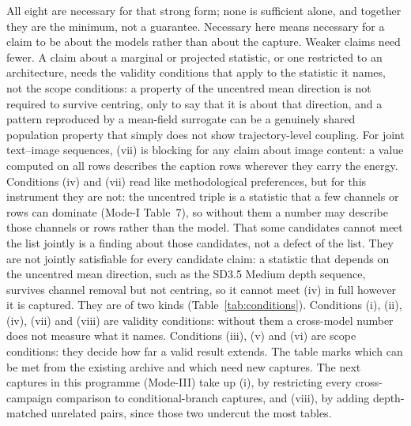 \documentclass[11pt]{article}
\theoremstyle{definition}
\begin{document}
All eight are necessary for that strong form; none is sufficient alone, and together they are the minimum, not a guarantee. Necessary here means necessary for a claim to be about the models rather than about the capture. Weaker claims need fewer. A claim about a marginal or projected statistic, or one restricted to an architecture, needs the validity conditions that apply to the statistic it names, not the scope conditions: a property of the uncentred mean direction is not required to survive centring, only to say that it is about that direction, and a pattern reproduced by a mean-field surrogate can be a genuinely shared population property that simply does not show trajectory-level coupling. For joint text--image sequences, (vii) is blocking for any claim about image content: a value computed on all rows describes the caption rows wherever they carry the energy. Conditions (iv) and (vii) read like methodological preferences, but for this instrument they are not: the uncentred triple is a statistic that a few channels or rows can dominate (Mode-I Table~7), so without them a number may describe those channels or rows rather than the model. That some candidates cannot meet the list jointly is a finding about those candidates, not a defect of the list. They are not jointly satisfiable for every candidate claim: a statistic that depends on the uncentred mean direction, such as the SD3.5 Medium depth sequence, survives channel removal but not centring, so it cannot meet (iv) in full however it is captured. They are of two kinds (Table~\ref{tab:conditions}). Conditions (i), (ii), (iv), (vii) and (viii) are validity conditions: without them a cross-model number does not measure what it names. Conditions (iii), (v) and (vi) are scope conditions: they decide how far a valid result extends. The table marks which can be met from the existing archive and which need new captures. The next captures in this programme (Mode-III) take up (i), by restricting every cross-campaign comparison to conditional-branch captures, and (viii), by adding depth-matched unrelated pairs, since those two undercut the most tables.
\end{document}
